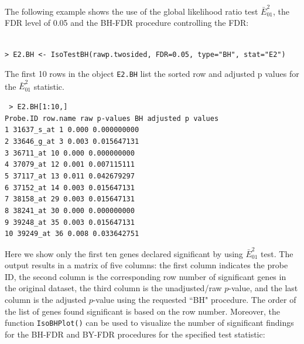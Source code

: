 The following example shows the use of the global likelihood ratio
test $\bar{E}^{2}_{01}$, the FDR level of 0.05 and the BH-FDR
procedure controlling the FDR: \\ \\
\begin{center}
\begin{boxit}
\begin{verbatim}
> E2.BH <- IsoTestBH(rawp.twosided, FDR=0.05, type="BH", stat="E2")
\end{verbatim}
\end{boxit}
\end{center}
The first 10 rows in the object \texttt{E2.BH} list the sorted row and adjusted p values for the $\bar{E}^{2}_{01}$ statistic.
\begin{center}
\begin{boxit}
\texttt{
> E2.BH[1:10,]\\
   Probe.ID    row.name raw p-values BH adjusted p values\\
1  31637\_s\_at   1        0.000          0.000000000\\
2  33646\_g\_at   3        0.003          0.015647131\\
3  36711\_at      10       0.000          0.000000000\\
4  37079\_at      12       0.001          0.007115111\\
5  37117\_at      13       0.011          0.042679297\\
6  37152\_at      14       0.003          0.015647131\\
7  38158\_at      29       0.003          0.015647131\\
8  38241\_at      30       0.000          0.000000000\\
9  39248\_at      35       0.003          0.015647131\\
10 39249\_at      36       0.008          0.033642751\\
}
\end{boxit}
\end{center}
Here we show only the first ten genes declared significant by using
$\bar{E}^{2}_{01}$ test. The output results in a matrix of five
columns: the first column indicates the probe ID, the second column
is the corresponding row number of significant genes in the original
dataset, the third column is the unadjusted/raw $p$-value, and the
last column is the adjusted $p$-value using the requested ``BH"
procedure. The order of the list of genes found significant is based
on the row number. Moreover, the function \texttt{IsoBHPlot()} can
be used to visualize the number of significant findings for the
BH-FDR and BY-FDR procedures for the specified test statistic:

